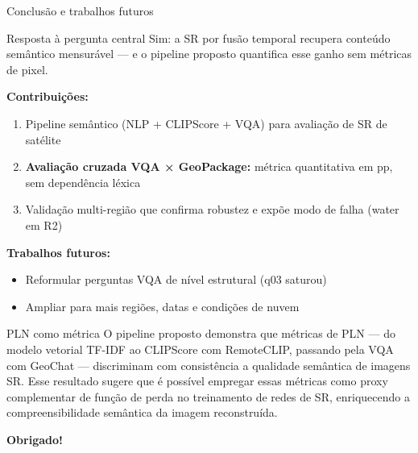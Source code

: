 \documentclass[aspectratio=169]{beamer}
\begin{document}
\begin{frame}{Conclusão e trabalhos futuros}

  \begin{block}{Resposta à pergunta central}
    Sim: a SR por fusão temporal recupera conteúdo semântico mensurável — e o pipeline proposto quantifica esse ganho sem métricas de pixel.
  \end{block}

  \vspace{0.4em}
  \textbf{Contribuições:}
  \begin{enumerate}
    \item Pipeline semântico (NLP + CLIPScore + VQA) para avaliação de SR de satélite
    \item \textbf{Avaliação cruzada VQA × GeoPackage:} métrica quantitativa em pp, sem dependência léxica
    \item Validação multi-região que confirma robustez e expõe modo de falha (water em R2)
  \end{enumerate}

  \vspace{0.4em}
  \textbf{Trabalhos futuros:}
  \begin{itemize}
    \item Reformular perguntas VQA de nível estrutural (q03 saturou)
    \item Ampliar para mais regiões, datas e condições de nuvem
  \end{itemize}

\end{frame}

\begin{frame}[plain]
	\begin{block}{PLN como métrica}
		O pipeline proposto demonstra que métricas de PLN — do modelo vetorial TF-IDF ao CLIPScore com RemoteCLIP, passando pela VQA com GeoChat — discriminam com consistência a qualidade semântica de imagens SR. Esse resultado sugere que é possível empregar essas métricas como proxy complementar de função de perda no treinamento de redes de SR, enriquecendo a compreensibilidade semântica da imagem reconstruída.
\end{block}
\vspace{4em}
  \begin{center}
    \Large\textbf{Obrigado!}\\[1em]
    \normalsize
  \end{center}
\end{frame}

\end{document}
